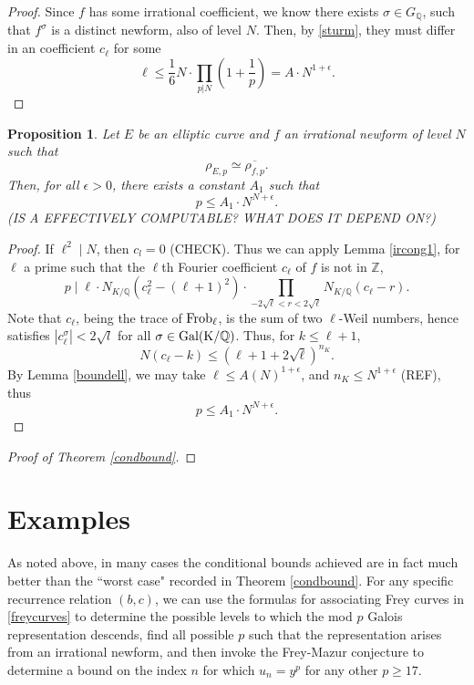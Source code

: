 \documentclass[12pt]{amsart}
\newtheorem{prop}[thm]{Proposition}
\theoremstyle{definition}
\def\Q{{\mathbb Q}}
\def\Z{{\mathbb Z}}
\newcommand{\Frob}{\rm Frob}
\renewcommand{\bar}{\overline}
\newcommand{\Gal}{\rm Gal}
\begin{document}
\begin{proof}
Since $f$ has some irrational coefficient, we know there exists $\sigma \in G_\Q$, such that $f^{\sigma}$ is a distinct newform, also of level $N$.  Then, by \ref{sturm}, they must differ in an coefficient $c_\ell$ for some 
\[ \ell \leq \frac{1}{6} N \cdot \prod_{p|N} \left(1 + \frac{1}{p} \right) = A \cdot N^{1+\epsilon}. \]
\end{proof}

\begin{prop}\label{irboundp}
Let $E$ be an elliptic curve and $f$ an irrational newform of level $N$ such that 
\[\rho_{E,p} \simeq \bar{\rho_{f,p}}.\]
Then, for all $\epsilon > 0$, there exists a constant $A_1$ such that
\[ p \leq  A_1 \cdot N^{N+\epsilon}. \]
(IS A EFFECTIVELY COMPUTABLE? WHAT DOES IT DEPEND ON?)
\end{prop}
\begin{proof}
If $\ell^2 \mid N$, then $c_l = 0$ (CHECK). Thus we can apply Lemma \ref{ircong1}, for $\ell$ a prime such that the $\ell$th Fourier coefficient $c_\ell$ of $f$ is not in $\Z$, 
\[ p \mid \ell \cdot N_{K / \mathbb{Q}}(c_\ell^2-(\ell+1)^2) \cdot \prod_{-2\sqrt{\ell} < r < 2\sqrt{\ell}}{N_{K / \mathbb{Q}}}(c_\ell - r).\]
Note that $c_\ell$, being the trace of $\Frob_\ell$, is the sum of two $\ell$-Weil numbers, hence satisfies $|c_\ell^{\sigma}| < 2\sqrt{l}$ for all $\sigma \in \Gal(K/\Q)$. Thus, for $k \leq \ell+1$, \[N(c_\ell - k) \leq (\ell+1 + 2\sqrt{\ell})^{n_{K}}.\] 
By Lemma \ref{boundell}, we may take $\ell \leq A \left( N \right)^{1+\epsilon}$, and $n_{K} \leq N^{1+\epsilon}$ (REF), thus
\[ p \leq A_1 \cdot N^{N+\epsilon}. \]
\end{proof}
 
 
 \begin{proof}[Proof of Theorem \ref{condbound}]
 
 
 \end{proof}

\section{Examples}\label{examples}

As noted above, in many cases the conditional bounds achieved are in fact much better than the ``worst case" recorded in Theorem \ref{condbound}.  For any specific recurrence relation $(b,c)$, we can use the formulas for associating Frey curves in \ref{freycurves} to determine the possible levels to which the mod $p$ Galois representation descends, find all possible $p$ such that the representation arises from an irrational newform, and then invoke the Frey-Mazur conjecture to determine a bound on the index $n$ for which $u_n=y^p$ for any other $p \geq 17$.  
\end{document}
